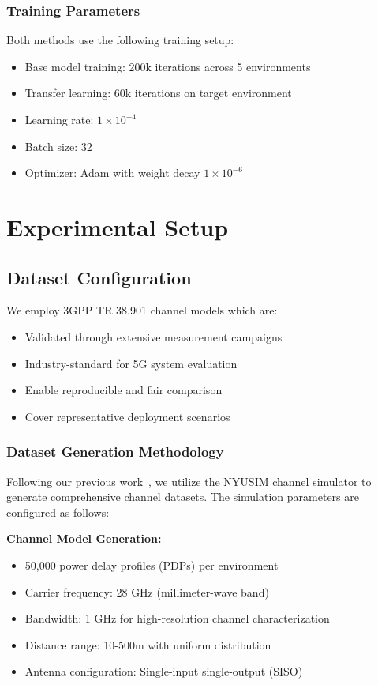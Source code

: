 \documentclass[conference]{IEEEtran}
\begin{document}
\subsubsection{Training Parameters}
Both methods use the following training setup:
\begin{itemize}
\item Base model training: 200k iterations across 5 environments
\item Transfer learning: 60k iterations on target environment
\item Learning rate: $1 \times 10^{-4}$
\item Batch size: 32
\item Optimizer: Adam with weight decay $1 \times 10^{-6}$
\end{itemize}

\section{Experimental Setup}

\subsection{Dataset Configuration}

We employ 3GPP TR 38.901 channel models which are:
\begin{itemize}
\item Validated through extensive measurement campaigns
\item Industry-standard for 5G system evaluation  
\item Enable reproducible and fair comparison
\item Cover representative deployment scenarios
\end{itemize}

\subsubsection{Dataset Generation Methodology}
Following our previous work~\cite{lee2024nyusim}, we utilize the NYUSIM channel simulator to generate comprehensive channel datasets. The simulation parameters are configured as follows:

\textbf{Channel Model Generation:}
\begin{itemize}
\item 50,000 power delay profiles (PDPs) per environment
\item Carrier frequency: 28 GHz (millimeter-wave band)
\item Bandwidth: 1 GHz for high-resolution channel characterization
\item Distance range: 10-500m with uniform distribution
\item Antenna configuration: Single-input single-output (SISO)
\end{itemize}
\end{document}
